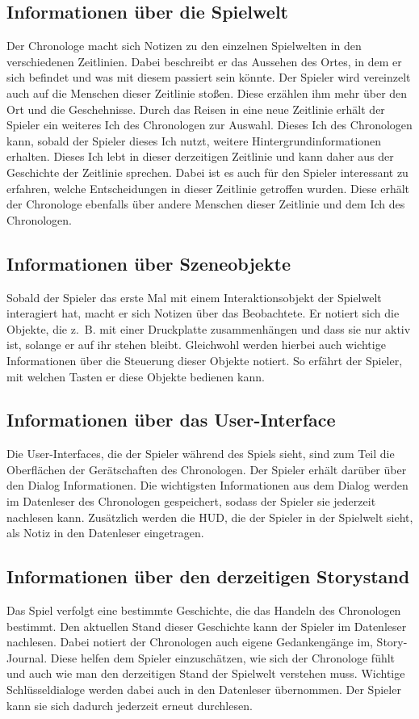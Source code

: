 \subsection{Informationen über die Spielwelt}
Der Chronologe macht sich Notizen zu den einzelnen Spielwelten in den verschiedenen Zeitlinien. Dabei beschreibt er das Aussehen des Ortes, in dem er sich befindet und was mit diesem passiert sein könnte. Der Spieler wird vereinzelt auch auf die Menschen dieser Zeitlinie stoßen. Diese erzählen ihm mehr über den Ort und die Geschehnisse. Durch das Reisen in eine neue Zeitlinie erhält der Spieler ein weiteres Ich des Chronologen zur Auswahl. Dieses Ich des Chronologen kann, sobald der Spieler dieses Ich nutzt, weitere Hintergrundinformationen erhalten. Dieses Ich lebt in dieser derzeitigen Zeitlinie und kann daher aus der Geschichte der Zeitlinie sprechen. 
Dabei ist es auch für den Spieler interessant zu erfahren, welche Entscheidungen in dieser Zeitlinie getroffen wurden. Diese erhält der Chronologe ebenfalls über andere Menschen dieser Zeitlinie und dem Ich des Chronologen.

\subsection{Informationen über Szeneobjekte}
Sobald der Spieler das erste Mal mit einem Interaktionsobjekt der Spielwelt interagiert hat, macht er sich Notizen über das Beobachtete. Er notiert sich die Objekte, die z. B. mit einer Druckplatte zusammenhängen und dass sie nur aktiv ist, solange er auf ihr stehen bleibt. Gleichwohl werden hierbei auch wichtige Informationen über die Steuerung dieser Objekte notiert. So erfährt der Spieler, mit welchen Tasten er diese Objekte bedienen kann.

\subsection{Informationen über das User-Interface}
Die User-Interfaces, die der Spieler während des Spiels sieht, sind zum Teil die Oberflächen der Gerätschaften des Chronologen. Der Spieler erhält darüber über den Dialog Informationen. Die wichtigsten Informationen aus dem Dialog werden im Datenleser des Chronologen gespeichert, sodass der Spieler sie jederzeit nachlesen kann. Zusätzlich werden die \ac{HUD}, die der Spieler in der Spielwelt sieht, als Notiz in den Datenleser eingetragen. 

\subsection{Informationen über den derzeitigen Storystand}
Das Spiel verfolgt eine bestimmte Geschichte, die das Handeln des Chronologen bestimmt. Den aktuellen Stand dieser Geschichte kann der Spieler im Datenleser nachlesen. Dabei notiert der Chronologen auch eigene Gedankengänge im, Story-Journal. Diese helfen dem Spieler einzuschätzen, wie sich der Chronologe fühlt und auch wie man den derzeitigen Stand der Spielwelt verstehen muss. Wichtige Schlüsseldialoge werden dabei auch in den Datenleser übernommen. Der Spieler kann sie sich dadurch jederzeit erneut durchlesen.

